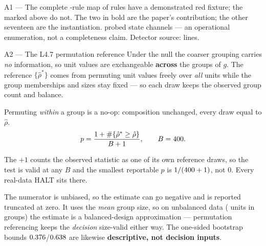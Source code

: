 \documentclass[aspectratio=169,11pt]{beamer}
\begin{document}
\begin{frame}{A1 --- The complete \Nrules{}-rule map}
  {\scriptsize \Nred{} of \Nrules{} rules have a demonstrated red fixture; the \Nnored{} marked
  above do not. The two in bold are the paper's contribution; the other seventeen are the
  instantiation. \Nstatechannels{} probed state channels --- an operational enumeration, not a
  completeness claim. Detector source: \Nloc{} lines.}
\end{frame}

\begin{frame}{A2 --- The L4.7 permutation reference}
  \small
  Under the null the coarser grouping carries \emph{no} information, so unit values are
  exchangeable \textbf{across} the groups of $g$. The reference $\{\hat{\rho}^{*}\}$ comes from
  permuting unit values freely over \emph{all} units while the group memberships and sizes stay
  fixed --- so each draw keeps the observed group count and balance.
  \vspace{0.3em}

  {\footnotesize Permuting \emph{within} a group is a no-op: composition unchanged, every draw
   equal to $\hat{\rho}$.}
  \[ p = \frac{1 + \#\{\hat{\rho}^{*} \ge \hat{\rho}\}}{B+1}, \qquad B = 400. \]
  {\footnotesize The $+1$ counts the observed statistic as one of its own reference draws, so the
   test is valid at any $B$ and the smallest reportable $p$ is $1/(400+1)$, not $0$. Every
   real-data HALT sits there.
   \vspace{0.25em}

   The numerator is unbiased, so the estimate can go negative and is reported truncated at zero.
   It uses the \emph{mean} group size, so on unbalanced data (\Natused{} units in \Natelsets{}
   groups) the estimate is a balanced-design approximation --- permutation referencing keeps the
   \emph{decision} size-valid either way. The one-sided bootstrap bounds $0.376$/$0.638$ are
   likewise \textbf{descriptive, not decision inputs}.}
\end{frame}
\end{document}
